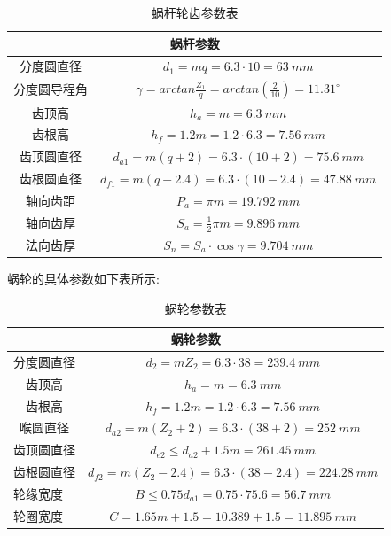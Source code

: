 \documentclass[UTF8,11pt,a4paper,oneside,final,zihao=-4,]{ctexrep}%
\begin{document}
	
	\begin{table}[h]\centering
		\begin{tabular}{cc}
			\hline
			\multicolumn{2}{c}{蜗杆参数}                                                                        \\ \hline
			\multicolumn{1}{c|}{分度圆直径}   & $d_1=mq=6.3\cdot10=63\ mm$                                      \\ \hline
			\multicolumn{1}{c|}{分度圆导程角} & $\gamma=arctan\frac{Z_1}{q}=arctan(\frac{2}{10})=11.31^{\circ}$ \\ \hline
			\multicolumn{1}{c|}{齿顶高}       & $h_a=m=6.3\ mm$                                                 \\ \hline
			\multicolumn{1}{c|}{齿根高}       & $h_f=1.2m=1.2\cdot6.3=7.56\ mm$                                 \\ \hline
			\multicolumn{1}{c|}{齿顶圆直径}   & $d_{a1}=m(q+2)=6.3\cdot(10+2)=75.6\ mm$                         \\ \hline
			\multicolumn{1}{c|}{齿根圆直径}   & $d_{f1}=m(q-2.4)=6.3\cdot(10-2.4)=47.88\ mm$                    \\ \hline
			\multicolumn{1}{c|}{轴向齿距}     & $P_a=\pi m=19.792\ mm$                                          \\ \hline
			\multicolumn{1}{c|}{轴向齿厚}     & $S_a=\frac{1}{2}\pi m =9.896\ mm$                               \\ \hline
			\multicolumn{1}{c|}{法向齿厚}     & $S_n=S_a\cdot \cos\gamma=9.704\ mm$                             \\ \hline
		\end{tabular}
		\caption{蜗杆轮齿参数表}
	\end{table}\newpage
	蜗轮的具体参数如下表所示:
	\begin{table}[h]\centering
		\begin{tabular}{cc}
			\hline
			\multicolumn{2}{c}{蜗轮参数}                                                      \\ \hline
			\multicolumn{1}{c|}{分度圆直径} & $d_2=mZ_2=6.3\cdot38=239.4\ mm$                 \\ \hline
			\multicolumn{1}{c|}{齿顶高}     & $h_a=m=6.3\ mm$                                 \\ \hline
			\multicolumn{1}{c|}{齿根高}     & $h_f=1.2m=1.2\cdot6.3=7.56\ mm$                 \\ \hline
			\multicolumn{1}{c|}{喉圆直径}   & $d_{a2}=m(Z_2+2)=6.3\cdot(38+2)=252\ mm$        \\ \hline
			\multicolumn{1}{c|}{齿顶圆直径} & $d_{e2}\le d_{a2}+1.5m=261.45\ mm$              \\ \hline
			\multicolumn{1}{c|}{齿根圆直径} & $d_{f2}=m(Z_2-2.4)=6.3\cdot(38-2.4)=224.28\ mm$ \\ \hline
			\multicolumn{1}{l|}{轮缘宽度}   & $B\le 0.75d_{a1}=0.75\cdot 75.6=56.7\ mm$       \\ \hline
			\multicolumn{1}{l|}{轮圈宽度}   & $C=1.65m+1.5=10.389+1.5=11.895\ mm$             \\ \hline
		\end{tabular}
		\caption{蜗轮参数表}
	\end{table}\ \
\end{document}
